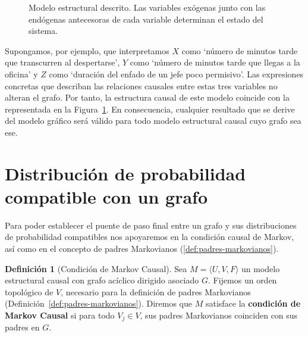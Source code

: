 \documentclass[a4paper,11pt,spanish, twoside]{tfg-uam-matematicas_25-26}
\theoremstyle{definition}
\newtheorem{defin}[teor]{Definición}
\begin{document}
\begin{figure}[ht]
    \centering
{}
\caption{Modelo estructural descrito. Las variables exógenas junto con las endógenas antecesoras de cada variable determinan el estado del sistema.}
\label{fig:grafo-interruptor}
\end{figure}

Supongamos, por ejemplo, que interpretamos $X$ como `número de minutos tarde que transcurren al despertarse', $Y$ como `número de minutos tarde que llegas a la oficina' y $Z$ como `duración del enfado de un jefe poco permisivo'. Las expresiones concretas que describan las relaciones causales entre estas tres variables no alteran el grafo. Por tanto, la estructura causal de este modelo coincide con la representada en la Figura~\ref{fig:grafo-interruptor}. En consecuencia, cualquier resultado que se derive del modelo gráfico será válido para todo modelo estructural causal cuyo grafo sea ese.

\section{Distribución de probabilidad compatible con un grafo}
Para poder establecer el puente de paso final entre un grafo y sus distribuciones de probabilidad compatibles nos apoyaremos en la condición causal de Markov, así como en el concepto de padres Markovianos (\ref{def:padres-markovianos}).

\begin{defin}[Condición de Markov Causal]
\label{markov-causal}
Sea $M = \langle U, V, F\rangle$ un modelo estructural causal con grafo acíclico dirigido asociado $G$. 
Fijemos un orden topológico de $V$, necesario para la 
definición de padres Markovianos (Definición~\ref{def:padres-markovianos}). 
Diremos que $M$ satisface la \textbf{condición de Markov Causal} 
si para todo $V_j \in V$, sus padres Markovianos coinciden 
con sus padres en $G$.
\end{defin}
\end{document}
